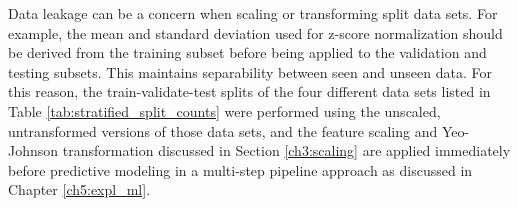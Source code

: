 Data leakage can be a concern when scaling or transforming split data sets. For example, the mean and standard deviation used for z-score normalization should be derived from the training subset before being applied to the validation and testing subsets. This maintains separability between seen and unseen data. For this reason, the train-validate-test splits of the four different data sets listed in Table \ref{tab:stratified_split_counts} were performed using the unscaled, untransformed versions of those data sets, and the feature scaling and Yeo-Johnson transformation discussed in Section \ref{ch3:scaling} are applied immediately before predictive modeling in a multi-step pipeline approach as discussed in Chapter \ref{ch5:expl_ml}.

\begin{table}[!htp]
\end{table}
